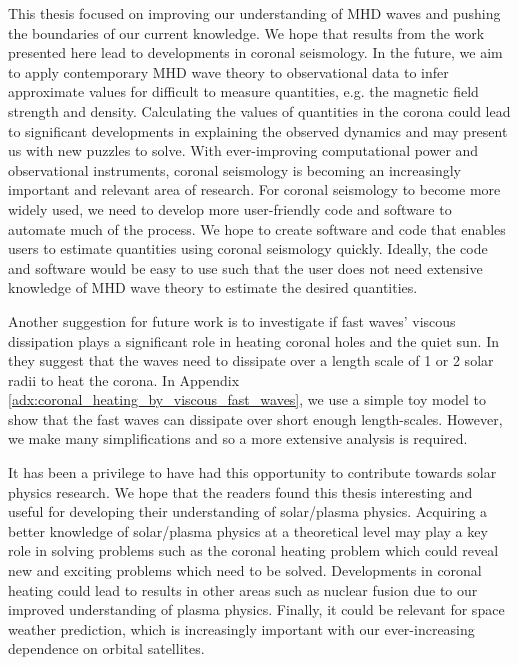 This thesis focused on improving our understanding of MHD waves and pushing the boundaries of our current knowledge. We hope that results from the work presented here lead to developments in coronal seismology. In the future, we aim to apply contemporary MHD wave theory to observational data to infer approximate values for difficult to measure quantities, e.g. the magnetic field strength and density. Calculating the values of quantities in the corona could lead to significant developments in explaining the observed dynamics and may present us with new puzzles to solve. With ever-improving computational power and observational instruments, coronal seismology is becoming an increasingly important and relevant area of research. For coronal seismology to become more widely used, we need to develop more user-friendly code and software to automate much of the process. We hope to create software and code that enables users to estimate quantities using coronal seismology quickly. Ideally, the code and software would be easy to use such that the user does not need extensive knowledge of MHD wave theory to estimate the desired quantities. 

Another suggestion for future work is to investigate if fast waves' viscous dissipation plays a significant role in heating coronal holes and the quiet sun. In \citet{Withbroe1977,Parker1991} they suggest that the waves need to dissipate over a length scale of 1 or 2 solar radii to heat the corona. In Appendix \ref{adx:coronal_heating_by_viscous_fast_waves}, we use a simple toy model to show that the fast waves can dissipate over short enough length-scales. However, we make many simplifications and so a more extensive analysis is required. 

It has been a privilege to have had this opportunity to contribute towards solar physics research. We hope that the readers found this thesis interesting and useful for developing their understanding of solar/plasma physics. Acquiring a better knowledge of solar/plasma physics at a theoretical level may play a key role in solving problems such as the coronal heating problem which could reveal new and exciting problems which need to be solved. Developments in coronal heating could lead to results in other areas such as nuclear fusion due to our improved understanding of plasma physics.  Finally, it could be relevant for space weather prediction,  which is increasingly important with our ever-increasing dependence on orbital satellites.
